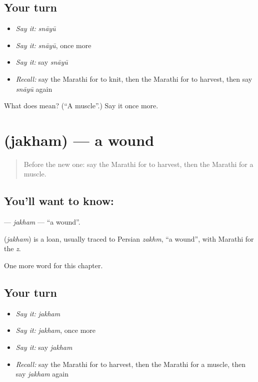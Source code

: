 \subsection*{Your turn}
\begin{itemize}
\raggedright
  \item \emph{Say it:} \emph{snāyū}
  \item \emph{Say it:} \emph{snāyū}, once more
  \item \emph{Say it:} say \emph{snāyū}
  \item \emph{Recall:} say the Marathi for to knit, then the Marathi for to harvest, then say \emph{snāyū} again
\end{itemize}

\begin{tcolorbox}[breakable,colback=teal!4,colframe=teal!35!black,title={Before you move on}]
What does  mean? (\textquotedblleft{}A muscle\textquotedblright{}.) Say it once more.
\end{tcolorbox}
\section[\texorpdfstring{\mr{जखम} (jakham)}{जखम (jakham)}]{ (jakham) — a wound}

\label{lesson:MR-C200-jakham}



\begin{quote}
Before the new one: say the Marathi for to harvest, then the Marathi for a muscle.
\end{quote}

\subsection*{You'll want to know: }
\textbf{} — \emph{jakham} — \textquotedblleft{}a wound\textquotedblright{}.

\begin{cousinweb}
\textbf{} (\emph{jakham}) is a loan, usually traced to Persian \emph{zakhm}, \textquotedblleft{}a wound\textquotedblright{}, with Marathi \textbf{} for the \emph{z}.
\end{cousinweb}

\begin{grammarlens}[title={What you've built}]
One more word for this chapter.
\end{grammarlens}

\subsection*{Your turn}
\begin{itemize}
\raggedright
  \item \emph{Say it:} \emph{jakham}
  \item \emph{Say it:} \emph{jakham}, once more
  \item \emph{Say it:} say \emph{jakham}
  \item \emph{Recall:} say the Marathi for to harvest, then the Marathi for a muscle, then say \emph{jakham} again
\end{itemize}


